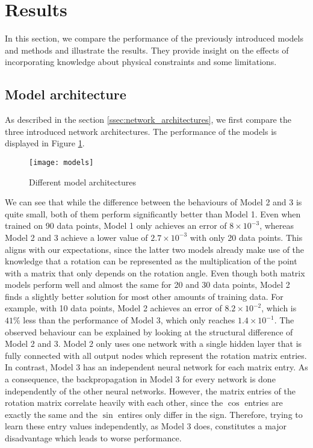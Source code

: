 \label{section:results}
\section{Results}

In this section, we compare the performance of the previously introduced models and methods and illustrate the results. They provide insight on the effects of incorporating knowledge about physical constraints and some limitations.

\subsection{Model architecture}
As described in the section \ref{ssec:network_architectures}, we first compare the three introduced network architectures. The performance of the models is displayed in Figure \ref{fig:models}.
\begin{figure}[H]
	\texttt{[image: models]}
	\caption{Different model architectures}
	\label{fig:models}
\end{figure}
We can see that while the difference between the behaviours of Model 2 and 3 is quite small, both of them perform significantly better than Model 1. Even when trained on 90 data points, Model 1 only achieves an error of $8\times 10^{-3}$, whereas Model 2 and 3 achieve a lower value of $2.7\times 10^{-3}$ with only 20 data points. This aligns with our expectations, since the latter two models already make use of the knowledge that a rotation can be represented as the multiplication of the point with a matrix that only depends on the rotation angle. Even though both matrix models perform well and almost the same for 20 and 30 data points, Model 2 finds a slightly better solution for most other amounts of training data. For example, with 10 data points, Model 2 achieves an error of $8.2\times 10^{-2}$, which is $41\%$ less than the performance of Model 3, which only reaches $1.4\times 10^{-1}$. The observed behaviour can be explained by looking at the structural difference of Model 2 and 3. Model 2 only uses one network with a single hidden layer that is fully connected with all output nodes which represent the rotation matrix entries. In contrast, Model 3 has an independent neural network for each matrix entry. As a consequence, the backpropagation in Model 3 for every network is done independently of the other neural networks. However, the matrix entries of the rotation matrix correlate heavily with each other, since the $\cos$ entries are exactly the same and the $\sin$ entires only differ in the sign. Therefore, trying to learn these entry values independently, as Model 3 does, constitutes a major disadvantage which leads to worse performance. \\
